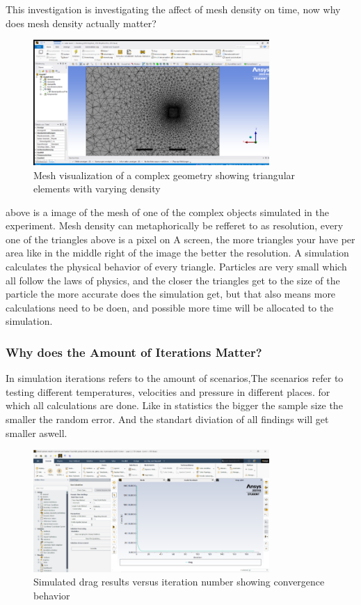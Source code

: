 \documentclass[12pt,a4paper]{article}
\begin{document}
This investigation is investigating the affect of mesh density on time, now why does mesh density actually matter?

\begin{figure}[H]
    \centering
    \includegraphics[width=0.8\textwidth]{image7.png}
    \caption{Mesh visualization of a complex geometry showing triangular elements with varying density}
    \label{fig:mesh_example}
\end{figure}

above is a image of the mesh of one of the complex objects simulated in the experiment. Mesh density can metaphorically be refferet to as resolution, every one of the triangles above is a pixel on A screen, the more triangles your have per area like in the middle right of the image the better the resolution. A simulation calculates the physical behavior of every triangle. Particles are very small which all follow the laws of physics, and the closer the triangles get to the size of the particle the more accurate does the simulation get, but that also means more calculations need to be doen, and possible more time will be allocated to the simulation.

\subsubsection{Why does the Amount of Iterations Matter?}

In simulation iterations refers to the amount of scenarios,The scenarios refer to testing different temperatures, velocities and pressure in different places. for which all calculations are done. Like in statistics the bigger the sample size the smaller the random error. And the standart diviation of all findings will get smaller aswell. 

\begin{figure}[H]
    \centering
    \includegraphics[width=0.8\textwidth]{image6.png}
    \caption{Simulated drag results versus iteration number showing convergence behavior}
    \label{fig:convergence}
\end{figure}
\end{document}
